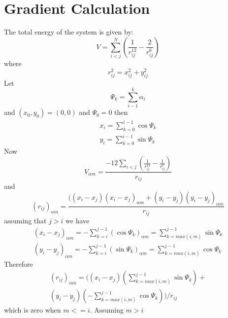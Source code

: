 \documentclass[conference,letterpaper]{IEEEtran}
\begin{document}
\section{Gradient Calculation}
The total energy of the system is given by:
\begin{equation}
    V = \sum_{i<j}^{N}(\frac{1}{r_{ij}^{12}} - \frac{2}{r_{ij}^{6}})
\end{equation}
where
\begin{equation}
    r^{2}_{ij} = x^{2}_{ij} + y^{2}_{ij}
\end{equation}
Let
\begin{equation}
    \Psi_{k}=\sum_{i-1}^{k}\alpha_{i}
\end{equation}
and $(x_{0}, y_{0})=(0,0)$ and $\Psi_{0}=0$ then
\begin{equation}
    \begin{split}
        x_{i} = \sum_{k=0}^{i-1}\cos{\Psi_{k}} \\
        y_{i} = \sum_{k=0}^{i-1}\sin{\Psi_{k}}
    \end{split}
\end{equation}
Now
\begin{equation}
    V_{\alpha m} = \frac{-12 \sum_{i < j} (\frac{1}{r_{ij}^{13}} - \frac{1}{r_{ij}^{7}})}{r_{ij}}
\end{equation}
and
\begin{equation}
    (r_{ij})_{\alpha m} = \frac{((x_{i} - x_{j})(x_{i} - x_{j})_{\alpha m} + (y_{i} - y_{j})(y_{i} - y_{j})_{\alpha m}}{r_{ij}}
\end{equation}
assuming that $j > i$ we have
\begin{equation}
    \begin{split}
        (x_{i} - x_{j})_{\alpha m} = -\sum_{k=i}^{j-1}(\cos{\Psi_{k}})_{\alpha m} = \sum_{k=max(i,m)}^{j-1} \sin{\Psi_{k}} \\
        (y_{i} - y_{j})_{\alpha m} = -\sum_{k=i}^{j-1}(\sin{\Psi_{k}})_{\alpha m} = \sum_{k=max(i,m)}^{j-1} \cos{\Psi_{k}}
    \end{split}
\end{equation}
Therefore
\begin{equation}
    \begin{split}
        (r_{ij})_{\alpha m} = ((x_{i}-x_{j})(\sum_{k=max(i,m)}^{j-1}\sin{\Psi_{k}}) +\\
        (y_{i}-y_{j})(-\sum_{k=max(i, m)}^{j-1}\cos{\Psi_{k}}))/r_{ij}
    \end{split}
\end{equation}
which is zero when $m <= i$. Assuming $m > i$
\end{document}

